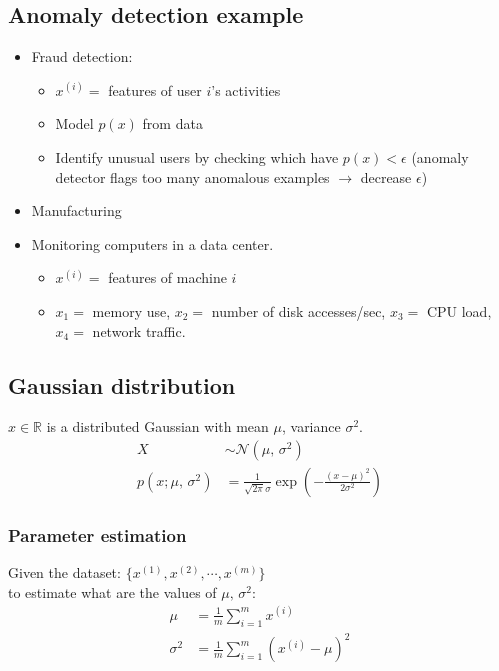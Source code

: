 \subsection{Anomaly detection example}
\begin{itemize}
\item
Fraud detection:
    \begin{itemize}
    \item
    $x^{(i)} =$ features of user $i$'s activities
    \item
    Model $p(x)$ from data
    \item
    Identify unusual users by checking which have $p(x) < \epsilon$ (anomaly detector flags too many anomalous examples $\rightarrow$ decrease $\epsilon$)
    \end{itemize}
\item
Manufacturing
\item
Monitoring computers in a data center.
    \begin{itemize}
    \item
    $x^{(i)} = $ features of machine $i$
    \item
    $x_1 = $ memory use, $x_2 = $ number of disk accesses/sec, $x_3 = $ CPU load, $x_4 = $ network traffic.
    \end{itemize}
\end{itemize}

%
\subsection{Gaussian distribution}
$x \in \mathbb{R}$ is a distributed Gaussian with mean $\mu$, variance $\sigma^2$.
\begin{align}
X & \sim \mathcal{N}(\mu,\,\sigma^{2})\\
p(x;\mu,\,\sigma^{2}) &= \frac{1}{\sqrt{2\pi}\sigma}\exp{(-\frac{(x-\mu)^2}{2\sigma^{2}})}
\end{align}

\subsubsection{Parameter estimation}
Given the dataset: $\{x^{(1)}, x^{(2)}, \cdots, x^{(m)}\}$\\
to estimate what are the values of $\mu,\,\sigma^{2}$:
\begin{align}
\mu &= \frac{1}{m}\sum_{i=1}^mx^{(i)}\\
\sigma^{2} &= \frac{1}{m}\sum_{i=1}^m(x^{(i)}-\mu)^2
\end{align}

